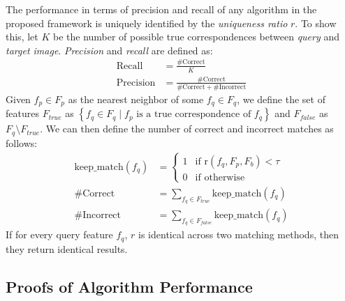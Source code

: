 \documentclass[review]{elsarticle}
\newcommand{\twopartdef}[4]
{
	\left\{
		\begin{array}{ll}
			#1 & \mbox{if } #2 \\
			#3 & \mbox{if } #4
		\end{array}
	\right.
}
\begin{document}
The performance in terms of precision and recall of any algorithm in the proposed framework is uniquely identified by the \emph{uniqueness ratio} $r$. To show this, let $K$ be the number of possible true correspondences between \emph{query} and \emph{target image}. \emph{Precision} and \emph{recall} are defined as:
\begin{align*}
    \textrm{Recall} &= \frac{\#\textrm{Correct}}{K} \\
    \textrm{Precision} &= \frac{\#\textrm{Correct}}{\#\textrm{Correct} + \#\textrm{Incorrect}}
\end{align*}
Given $f_{p} \in F_{p}$ as the nearest neighbor of some $f_q \in F_{q}$, we define the set of features $F_{true}$ as $\left\{ f_{q} \in F_{q} \mid f_{p} \text{ is a true correspondence of } f_{q} \right\}$ and $F_{false}$ as $F_{q} \setminus F_{true}$.  We can then define the number of correct and incorrect matches as follows:
\begin{align*}
    \textrm{keep\_match}(f_{q}) &= \twopartdef{ 1 }{\text{r}(f_{q}, 
    F_{p}, F_{b}) <
    \tau}{0}{\textrm{otherwise}} \\
    \#\textrm{Correct} &= \sum_{f_{q} \in F_{true}} 
    \textrm{keep\_match}(f_{q})\\
    \#\textrm{Incorrect} &= \sum_{f_{q} \in F_{false}}
    \textrm{keep\_match}(f_{q})
\end{align*}
If for every query feature $f_{q}$, $r$ is identical across two matching methods, then they return identical results. 

\subsection{Proofs of Algorithm Performance}
\label{S:Proofs}
\end{document}
